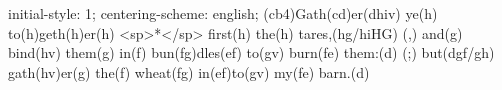 initial-style: 1;
centering-scheme: english;
(cb4)Gath(cd)er(dhiv) ye(h) to(h)geth(h)er(h) <sp>*</sp> first(h) the(h) tares,(hg/hiHG) (,) and(g) bind(hv) them(g) in(f) bun(fg)dles(ef) to(gv) burn(fe) them:(d) (;) but(dgf/gh) gath(hv)er(g) the(f) wheat(fg) in(ef)to(gv) my(fe) barn.(d)
